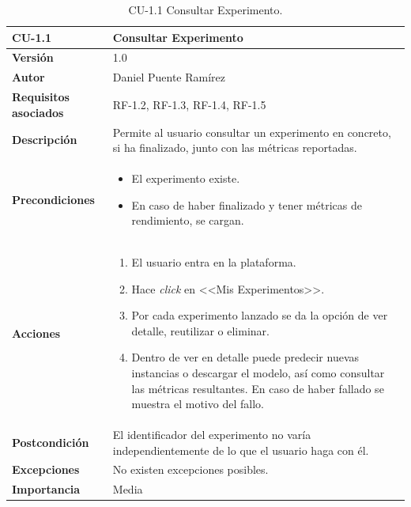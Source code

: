 \begin{table}[p]
\centering
\begin{tabularx}{\linewidth}{ p{} p{} }
\toprule
\textbf{CU-1.1} & \textbf{Consultar Experimento}\\
\toprule
\textbf{Versión} & 1.0\\
\textbf{Autor} & Daniel Puente Ramírez\\
\textbf{Requisitos asociados} & RF-1.2, RF-1.3, RF-1.4, RF-1.5\\
\textbf{Descripción} & Permite al usuario consultar un experimento en concreto, si ha finalizado, junto con las métricas reportadas.\\
\textbf{Precondiciones} & 
\begin{itemize}
\tightlist
\item El experimento existe.
\item En caso de haber finalizado y tener métricas de rendimiento, se cargan.
\end{itemize}\\
\textbf{Acciones} &
\begin{enumerate}
\def\labelenumi{\arabic{enumi}.}
\tightlist
\item El usuario entra en la plataforma.
\item Hace \textit{click} en <<Mis Experimentos>>.
\item Por cada experimento lanzado se da la opción de ver detalle, reutilizar o eliminar.
\item Dentro de ver en detalle puede predecir nuevas instancias o descargar el modelo, así como consultar las métricas resultantes. En caso de haber fallado se muestra el motivo del fallo.
\end{enumerate}\\
\textbf{Postcondición} & El identificador del experimento no varía independientemente de lo que el usuario haga con él.\\
\textbf{Excepciones} & No existen excepciones posibles.\\
\textbf{Importancia} & Media \\
\bottomrule
\end{tabularx}
\caption{CU-1.1 Consultar Experimento.}
\end{table}


